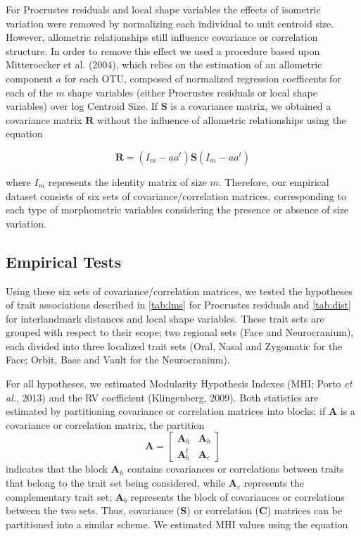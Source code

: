 \documentclass[12pt,twoside]{report}
\begin{document}
For Procrustes residuals and local shape variables the effects of
isometric variation were removed by normalizing each individual to unit
centroid size. However, allometric relationships still influence
covariance or correlation structure. In order to remove this effect we
used a procedure based upon Mitteroecker et al. (2004), which relies on
the estimation of an allometric component $a$ for each OTU, composed of
normalized regression coefficents for each of the $m$ shape variables
(either Procrustes residuals or local shape variables) over log Centroid
Size. If $\mathbf{S}$ is a covariance matrix, we obtained a covariance
matrix $\mathbf{R}$ without the influence of allometric relationships
using the equation

\begin{equation}
\mathbf{R} = (I_m - aa^t) \mathbf{S} (I_m - aa^t)
\label{eq:allo}
\end{equation}

where $I_m$ represents the identity matrix of size $m$. Therefore, our
empirical dataset consists of six sets of covariance/correlation
matrices, corresponding to each type of morphometric variables
considering the presence or absence of size variation.

\subsection{Empirical Tests}\label{empirical-tests}

Using these six sets of covariance/correlation matrices, we tested the
hypotheses of trait associations described in \autoref{tab:lms} for
Procrustes residuals and \autoref{tab:dist} for interlandmark distances
and local shape variables. These trait sets are grouped with respect to
their scope; two regional sets (Face and Neurocranium), each divided
into three localized trait sets (Oral, Nasal and Zygomatic for the Face;
Orbit, Base and Vault for the Neurocranium).

For all hypotheses, we estimated Modularity Hypothesis Indexes (MHI;
Porto \emph{et al.}, 2013) and the RV coefficient (Klingenberg, 2009).
Both statistics are estimated by partitioning covariance or correlation
matrices into blocks; if $\mathbf{A}$ is a covariance or correlation
matrix, the partition \[
\mathbf{A} =
\begin{bmatrix}
\mathbf{A}_h & \mathbf{A}_b \\
\mathbf{A}^t_b & \mathbf{A}_c
\end{bmatrix}
\] indicates that the block $\mathbf{A}_h$ contains covariances or
correlations between traits that belong to the trait set being
considered, while $\mathbf{A}_c$ represents the complementary trait set;
$\mathbf{A}_b$ represents the block of covariances or correlations
between the two sets. Thus, covariance ($\mathbf{S}$) or correlation
($\mathbf{C}$) matrices can be partitioned into a similar scheme. We
estimated MHI values using the equation
\end{document}
